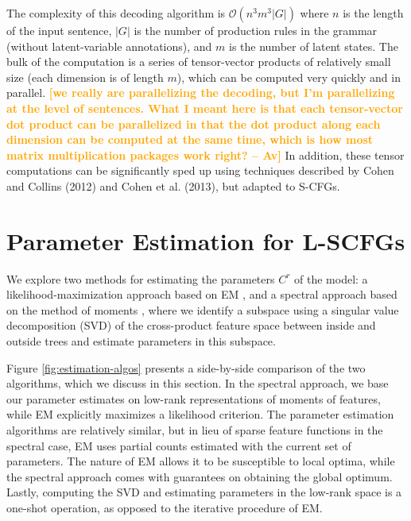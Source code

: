 \documentclass[11pt]{article}
\newcommand{\shaycomment}[1]{\textcolor{blue}{#1 -- Shay}}
\newcommand{\avcomment}[1]{\textcolor{orange}{\textbf{[#1 -- Av]}}}
\begin{document}
The complexity of this decoding algorithm is $\mathcal{O}(n^3 m^3 |G|)$ where $n$ is the length of the input sentence, $|G|$ is the number of production rules in the grammar (without latent-variable annotations), and $m$ is the number of latent states.
The bulk of the computation is a series of tensor-vector products of relatively small size (each dimension is of length $m$), which can be computed very quickly and in parallel.
\avcomment{we really are parallelizing the decoding, but I'm parallelizing at the level of sentences.  What I meant here is that each tensor-vector dot product can be parallelized in that the dot product along each dimension can be computed at the same time, which is how most matrix multiplication packages work right?} 
In addition, these tensor computations can be significantly
sped up using techniques described by Cohen and Collins (2012) and Cohen et al. (2013)\nocite{cohen-12c,cohen-13a}, but adapted to S-CFGs.  

\section{Parameter Estimation for L-SCFGs}
\label{sec:estimation}
We explore two methods for estimating the parameters $C^r$ of the model: a likelihood-maximization approach based on EM \cite{Dempster1977}, and a spectral approach based on the method of moments \cite{Hsu2009}, where we identify a subspace using a singular value decomposition (SVD) \cite{Golub1996} of the cross-product feature space between inside and outside trees and estimate parameters in this subspace. 

Figure \ref{fig:estimation-algos} presents a side-by-side comparison of the two algorithms, which we discuss in this section.  
In the spectral approach, we base our parameter estimates on low-rank representations of moments of features, while EM explicitly maximizes a likelihood criterion. 
The parameter estimation algorithms are relatively similar, but in lieu of sparse feature functions in the spectral case, EM uses partial counts estimated with the current set of parameters.  
The nature of EM allows it to be susceptible to local optima, while the spectral approach comes with guarantees on obtaining the global optimum. 
Lastly, computing the SVD and estimating parameters in the low-rank space is a one-shot operation, as opposed to the iterative procedure of EM. 
\end{document}
